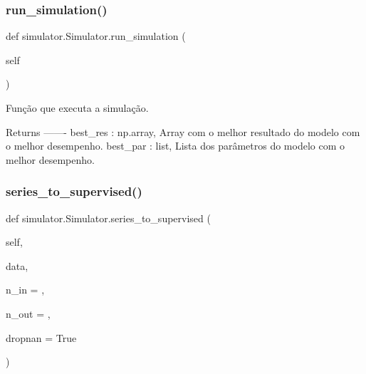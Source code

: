 \subsubsection{\texorpdfstring{run\+\_\+simulation()}{run\_simulation()}}
{\footnotesize\ttfamily def simulator.\+Simulator.\+run\+\_\+simulation (\begin{DoxyParamCaption}\item[{}]{self }\end{DoxyParamCaption})}

\begin{DoxyVerb}Função que executa a simulação.

Returns
-------
best_res : np.array,
    Array com o melhor resultado do modelo com o melhor desempenho.
best_par : list,
    Lista dos parâmetros do modelo com o melhor desempenho.\end{DoxyVerb}
 \mbox{\label{classsimulator_1_1Simulator_aac4274501be3a4b0f9f2102704d9e866}} 
\subsubsection{\texorpdfstring{series\+\_\+to\+\_\+supervised()}{series\_to\_supervised()}}
{\footnotesize\ttfamily def simulator.\+Simulator.\+series\+\_\+to\+\_\+supervised (\begin{DoxyParamCaption}\item[{}]{self,  }\item[{}]{data,  }\item[{}]{n\+\_\+in = {},  }\item[{}]{n\+\_\+out = {},  }\item[{}]{dropnan = {\ttfamily True} }\end{DoxyParamCaption})}

